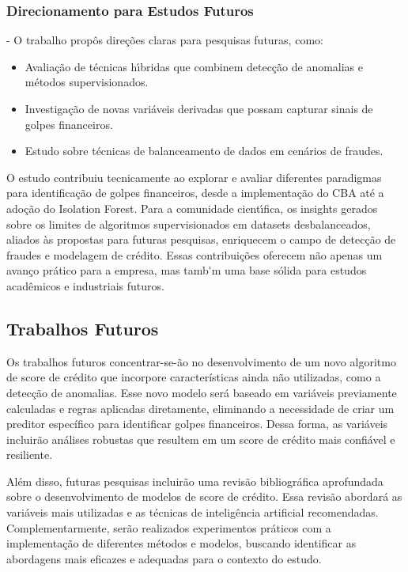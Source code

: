 \documentclass[12pt,a4paper]{article}
\begin{document}
\subsubsection{Direcionamento para Estudos Futuros}
- O trabalho prop\^os dire\c{c}\~{o}es claras para pesquisas futuras, como:
  \begin{itemize}
      \item Avalia\c{c}\~{a}o de t\'ecnicas h\'{\i}bridas que combinem detec\c{c}\~{a}o de anomalias e m\'etodos supervisionados.
      \item Investiga\c{c}\~{a}o de novas vari\'{a}veis derivadas que possam capturar sinais de golpes financeiros.
      \item Estudo sobre t\'ecnicas de balanceamento de dados em cen\'arios de fraudes.
  \end{itemize}

O estudo contribuiu tecnicamente ao explorar e avaliar diferentes paradigmas para identifica\c{c}\~{a}o de golpes financeiros, desde a implementa\c{c}\~{a}o do CBA at\'e a ado\c{c}\~{a}o do Isolation Forest. Para a comunidade cient\'{\i}fica, os insights gerados sobre os limites de algoritmos supervisionados em datasets desbalanceados, aliados \`as propostas para futuras pesquisas, enriquecem o campo de detec\c{c}\~{a}o de fraudes e modelagem de cr\'edito. Essas contribui\c{c}\~{o}es oferecem n\~{a}o apenas um avan\c{c}o pr\'atico para a empresa, mas tamb\'{\e}m uma base s\'olida para estudos acad\^{e}micos e industriais futuros.

\subsection{Trabalhos Futuros}

Os trabalhos futuros concentrar-se-\~{a}o no desenvolvimento de um novo algoritmo de score de cr\'edito que incorpore caracter\'isticas ainda n\~{a}o utilizadas, como a detec\c{c}\~{a}o de anomalias. Esse novo modelo ser\'a baseado em vari\'aveis previamente calculadas e regras aplicadas diretamente, eliminando a necessidade de criar um preditor espec\'ifico para identificar golpes financeiros. Dessa forma, as vari\'aveis incluir\~{a}o an\'alises robustas que resultem em um score de cr\'edito mais confi\'avel e resiliente.

Al\'em disso, futuras pesquisas incluir\~{a}o uma revis\~{a}o bibliogr\'afica aprofundada sobre o desenvolvimento de modelos de score de cr\'edito. Essa revis\~{a}o abordar\'a as vari\'aveis mais utilizadas e as t\'ecnicas de intelig\^encia artificial recomendadas. Complementarmente, ser\~{a}o realizados experimentos pr\'aticos com a implementa\c{c}\~{a}o de diferentes m\'etodos e modelos, buscando identificar as abordagens mais eficazes e adequadas para o contexto do estudo.
\end{document}
